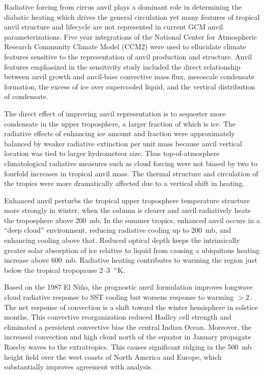 \documentclass[twoside,agupp]{aguplus}
\begin{document}
Radiative forcing from cirrus anvil plays a dominant role in
determining the diabatic heating which drives the general circulation
yet many features of tropical anvil structure and lifecycle are not
represented in current GCM anvil parameterizations.   
Five year integrations of the National Center for Atmospheric Research
Community Climate Model (CCM2) were used to ellucidate climate
features sensitive to the representation of anvil production and
structure. 
Anvil features emphasized in the sensitivity study included the
direct relationship between anvil growth and anvil-base convective 
mass flux, mesoscale condensate formation, the excess of ice over
supercooled liquid, and the vertical distribution of condensate. 

The direct effect of improving anvil representation is to sequester
more condensate in the upper troposphere, a larger fraction of which
is ice. 
The radiative effects of enhancing ice amount and fraction were
approximately balanced by weaker radiative extinction per unit mass
because anvil vertical location was tied to larger hydrometeor size.  
Thus top-of-atmosphere climatological radiative measures such as cloud
forcing were not biased by two to fourfold increases in tropical anvil
mass.
The thermal structure and circulation of the tropics were more
dramatically affected due to a vertical shift in heating.

Enhanced anvil perturbs the tropical upper troposphere temperature
structure more strongly in winter, when the column is clearer and
anvil radiatively heats the troposphere above 200~mb. 
In the summer tropics, enhanced anvil occurs in a ``deep cloud''
environment, reducing radiative cooling up to 200~mb, and enhancing
cooling above that. 
Reduced optical depth keeps the intrinsically greater solar absorption
of ice relative to liquid from causing a ubiquitous heating increase
above 600~mb.
Radiative heating contributes to warming the region just below the
tropical tropopause 2--3~$^{\circ}$K.   

Based on the 1987 El Ni\~no, the prognostic anvil formulation improves
longwave cloud radiative response to SST cooling but worsens response
to warming $> 2$\,\dgrc. 
The net response of convection is a shift toward the winter hemisphere
in solstice months.
This convective reorganization reduced Hadley cell strength and
eliminated a persistent convective bias the central Indian Ocean.
Moreover, the increased convection and high cloud north of the equator
in January propagate Rossby waves to the extratropics.  
This causes significant ridging in the 500~mb height field over the
west coasts of North America and Europe, which substantially improves
agreement with analysis. 
\end{document}

